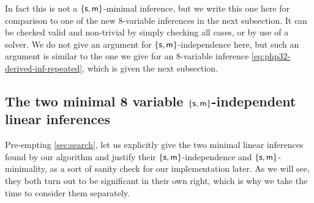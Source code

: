 \documentclass[a4paper, UKenglish, cleveref]{lipics-v2019}
\begin{document}
%
%
%
%
In fact this is not a $\{ \mathsf{s},\mathsf{m} \}$-minimal inference, but we write this one here for comparison to one of the new 8-variable inferences in the next subsection.
%
%
It can be checked valid and non-trivial by simply checking all cases, or by use of a solver.
We do not give an argument for $\{\mathsf{s},\mathsf{m} \}$-independence here, but such an argument is similar to the one we give for an 8-variable inference \cref{eq:php32-derived-inf-repeated}, which is given the next subsection.


\subsection{The two minimal 8 variable $\{\mathsf{s},\mathsf{m}\}$-independent linear inferences}
\label{sec:two-found-inferences}
Pre-empting \cref{sec:search}, let us explicitly give the two minimal linear inferences found by our algorithm and justify their $\{\mathsf{s},\mathsf{m} \}$-independence and $\{\mathsf{s},\mathsf{m} \}$-minimality, as a sort of sanity check for our implementation later.
As we will see, they both turn out to be significant in their own right, which is why we take the time to consider them separately.


\end{document}
